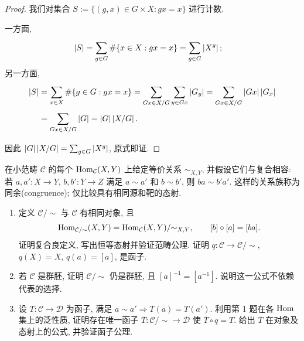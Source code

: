 \documentclass{article}
\begin{document}
\begin{proof}
	我们对集合 $S := \{(g,x) \in G \times X: gx = x\}$ 进行计数. 

	一方面, 
	\begin{align*}
		\left|S\right|
		&= \sum_{g \in G}^{}\#\{x \in X: gx = x\}
		= \sum_{g \in G}^{} \left|X^g\right|;
	\end{align*}
	另一方面, 
	\begin{align*}
		\left|S\right|
		&= \sum_{x \in X}^{}\#\{g \in G: gx = x\}
		= \sum_{Gx \in X/G}^{} \sum_{y \in Gx}^{} \left|G_y\right| 
		= \sum_{Gx \in X/G}^{} \left|Gx\right|\left|G_x\right| \\
		&= \sum_{Gx \in X/G}^{} \left|G\right|
		= \left|G\right| \left|X/G\right|.
	\end{align*}

	因此 $\left|G\right| \left|X/G\right| = \sum_{g \in G}^{}\left|X^g\right|$, 原式即证.
\end{proof}



\begin{problem}
在小范畴 $\mathcal C$ 的每个 $\operatorname{Hom}_{\mathcal C}(X,Y)$ 上给定等价关系 $\sim_{X,Y}$, 并假设它们与复合相容: 若 $a,a':X\to Y$, $b,b':Y\to Z$ 满足 $a\sim a'$ 和 $b\sim b'$, 则 $ba\sim b'a'$. 这样的关系族称为同余(congruence); 仅比较具有相同源和靶的态射.
\begin{enumerate}
  \item[(a)] 定义 $\mathcal C/{\sim}$ 与 $\mathcal C$ 有相同对象, 且
  \[
    \operatorname{Hom}_{\mathcal C/{\sim}}(X,Y)=\operatorname{Hom}_{\mathcal C}(X,Y)/{\sim_{X,Y}},\qquad [b]\circ[a]=[ba].
  \]
  证明复合良定义, 写出恒等态射并验证范畴公理. 证明 $q:\mathcal C\to\mathcal C/{\sim}$, $q(X)=X$, $q(a)=[a]$, 是函子.
  \item[(b)] 若 $\mathcal C$ 是群胚, 证明 $\mathcal C/{\sim}$ 仍是群胚, 且 $[a]^{-1}=[a^{-1}]$. 说明这一公式不依赖代表的选择.
  \item[(c)] 设 $T:\mathcal C\to\mathcal D$ 为函子, 满足 $a\sim a'\Rightarrow T(a)=T(a')$. 利用第 1 题在各 $\operatorname{Hom}$ 集上的泛性质, 证明存在唯一函子 $\overline T:\mathcal C/{\sim}\to\mathcal D$ 使 $\overline T\circ q=T$. 给出 $\overline T$ 在对象及态射上的公式, 并验证函子公理.
\end{enumerate}
\end{problem}
\end{document}
